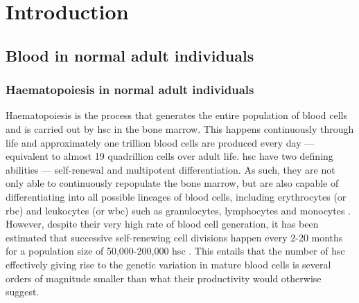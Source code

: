 \chapter{Introduction}

\section{Blood in normal adult individuals}

\subsection{Haematopoiesis in normal adult individuals}

Haematopoiesis is the process that generates the entire population of blood cells and is carried out by \ac{hsc} in the bone marrow. This happens continuously through life and approximately one trillion blood cells are produced every day \cite{Hoggatt2013-jl} --- equivalent to almost 19 quadrillion cells over adult life. \ac{hsc} have two defining abilities --- self-renewal and multipotent differentiation. As such, they are not only able to continuously repopulate the bone marrow, but are also capable of differentiating into all possible lineages of blood cells, including erythrocytes (or \ac{rbc}) and leukocytes (or \ac{wbc}) such as granulocytes, lymphocytes and monocytes \cite{Seita2010-ms,Till1961-mi,Becker1963-wm}. However, despite their very high rate of blood cell generation, it has been estimated that successive self-renewing cell divisions happen every 2-20 months for a population size of 50,000-200,000 \ac{hsc} \cite{Lee-Six2018-lp}. This entails that the number of \ac{hsc} effectively giving rise to the genetic variation in mature blood cells is several orders of magnitude smaller than what their productivity would otherwise suggest. 

